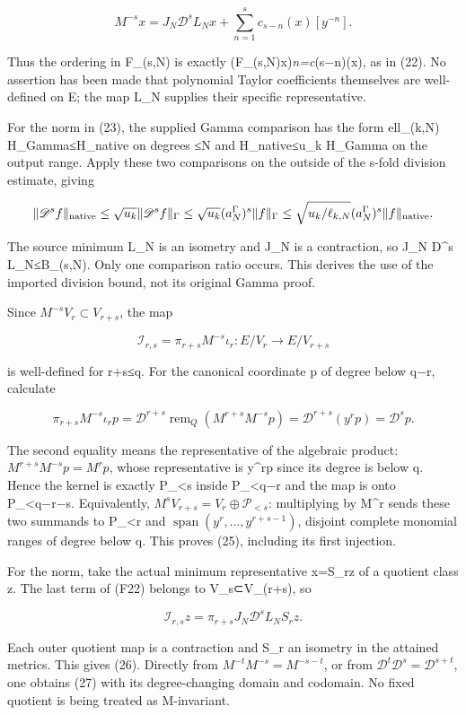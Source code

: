 \[
M^{-s}x=J_N\mathscr D^sL_Nx+
\sum_{n=1}^sc_{s-n}(x)[y^{-n}]. \tag{F22}
\]

Thus the ordering in F\_(s,N) is exactly (F\_(s,N)x)\emph{n=c}(s−n)(x), as in (22). No assertion has been made that polynomial Taylor coefficients themselves are well-defined on E; the map L\_N supplies their specific representative.

For the norm in (23), the supplied Gamma comparison has the form ell\_(k,N) H\_Gamma≤H\_native on degrees ≤N and H\_native≤u\_k H\_Gamma on the output range. Apply these two comparisons on the outside of the s-fold division estimate, giving

\[
\|\mathscr D^sf\|_{\rm native}
\le \sqrt{u_k}\|\mathscr D^sf\|_\Gamma
\le\sqrt{u_k}(a_N^\Gamma)^s\|f\|_\Gamma
\le\sqrt{u_k/\ell_{k,N}}(a_N^\Gamma)^s\|f\|_{\rm native}.
\]

The source minimum L\_N is an isometry and J\_N is a contraction, so \textbar\textbar J\_N D\^{}s L\_N\textbar\textbar≤B\_(s,N). Only one comparison ratio occurs. This derives the use of the imported division bound, not its original Gamma proof.

Since \(M^{-s}V_r\subset V_{r+s}\), the map

\[
\mathcal I_{r,s}=\pi_{r+s}M^{-s}\iota_r:E/V_r\to E/V_{r+s}
\]

is well-defined for r+s≤q. For the canonical coordinate p of degree below q−r, calculate

\[
\pi_{r+s}M^{-s}\iota_rp
=\mathscr D^{r+s}\operatorname{rem}_Q(M^{r+s}M^{-s}p)
=\mathscr D^{r+s}(y^rp)=\mathscr D^sp. \tag{F24}
\]

The second equality means the representative of the algebraic product: \(M^{r+s}M^{-s}p=M^rp\), whose representative is y\^{}rp since its degree is below q. Hence the kernel is exactly P\_\textless s inside P\_\textless q−r and the map is onto P\_\textless q−r−s. Equivalently, \(M^sV_{r+s}=V_r\oplus\mathcal P_{<s}\): multiplying by M\^{}r sends these two summands to P\_\textless r and \(\operatorname{span}(y^r,\ldots,y^{r+s-1})\), disjoint complete monomial ranges of degree below q. This proves (25), including its first injection.

For the norm, take the actual minimum representative x=S\_rz of a quotient class z. The last term of (F22) belongs to V\_s⊂V\_(r+s), so

\[
\mathcal I_{r,s}z=\pi_{r+s}J_N\mathscr D^sL_NS_rz.
\]

Each outer quotient map is a contraction and S\_r an isometry in the attained metrics. This gives (26). Directly from \(M^{-t}M^{-s}=M^{-s-t}\), or from \(\mathscr D^t\mathscr D^s=\mathscr D^{s+t}\), one obtains (27) with its degree-changing domain and codomain. No fixed quotient is being treated as M-invariant.

